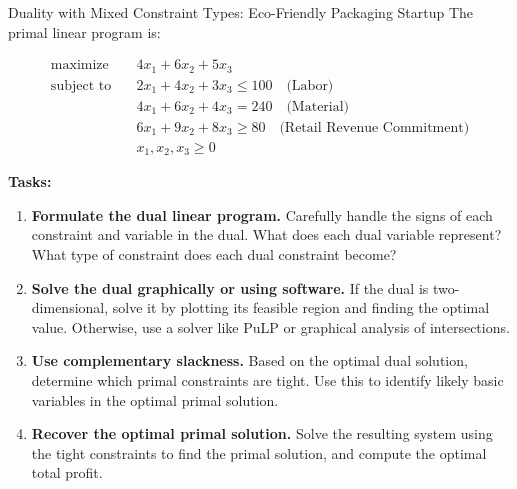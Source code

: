 \begin{ex}{Duality with Mixed Constraint Types: Eco-Friendly Packaging Startup}{}{}
The primal linear program is:

\[
\begin{aligned}
\text{maximize} \quad & 4x_1 + 6x_2 + 5x_3 \\
\text{subject to} \quad 
& 2x_1 + 4x_2 + 3x_3 \leq 100 \quad \text{(Labor)} \\
& 4x_1 + 6x_2 + 4x_3 = 240 \quad \text{(Material)} \\
& 6x_1 + 9x_2 + 8x_3 \geq 80 \quad \text{(Retail Revenue Commitment)} \\
& x_1, x_2, x_3 \geq 0
\end{aligned}
\]

\textbf{Tasks:}

\begin{enumerate}
  \item \textbf{Formulate the dual linear program.}  
  Carefully handle the signs of each constraint and variable in the dual. What does each dual variable represent? What type of constraint does each dual constraint become?

  \item \textbf{Solve the dual graphically or using software.}  
  If the dual is two-dimensional, solve it by plotting its feasible region and finding the optimal value. Otherwise, use a solver like PuLP or graphical analysis of intersections.

  \item \textbf{Use complementary slackness.}  
  Based on the optimal dual solution, determine which primal constraints are tight. Use this to identify likely basic variables in the optimal primal solution.

  \item \textbf{Recover the optimal primal solution.}  
  Solve the resulting system using the tight constraints to find the primal solution, and compute the optimal total profit.
\end{enumerate}
\end{ex}



